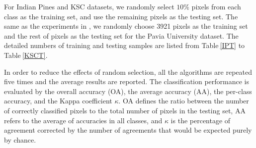 \documentclass[12pt,onecolumn]{IEEEtran}
\begin{document}
\begin{spacing}{2}
For Indian Pines and KSC datasets, we randomly select $10\%$ pixels from each class as the training set, and use the remaining pixels as the testing set. The same as the experiments in \cite{Hang2015Matrix}, we randomly choose 3921 pixels as the training set and the rest of pixels as the testing set for the Pavia University dataset. The detailed numbers of training and testing samples are listed from Table$~$\ref{IPT} to Table$~$\ref{KSCT}.

In order to reduce the effects of random selection, all the algorithms are repeated five times and the average results are reported. The classification performance is evaluated by the overall accuracy (OA), the average accuracy (AA), the per-class accuracy, and the Kappa coefficient $\kappa$. OA defines the
ratio between the number of correctly classified pixels to the total number of pixels in the testing set, AA refers to the average of accuracies in all classes, and $\kappa$ is the percentage of agreement corrected by the number of agreements that would be expected purely by chance.



\end{spacing}
\end{document}

